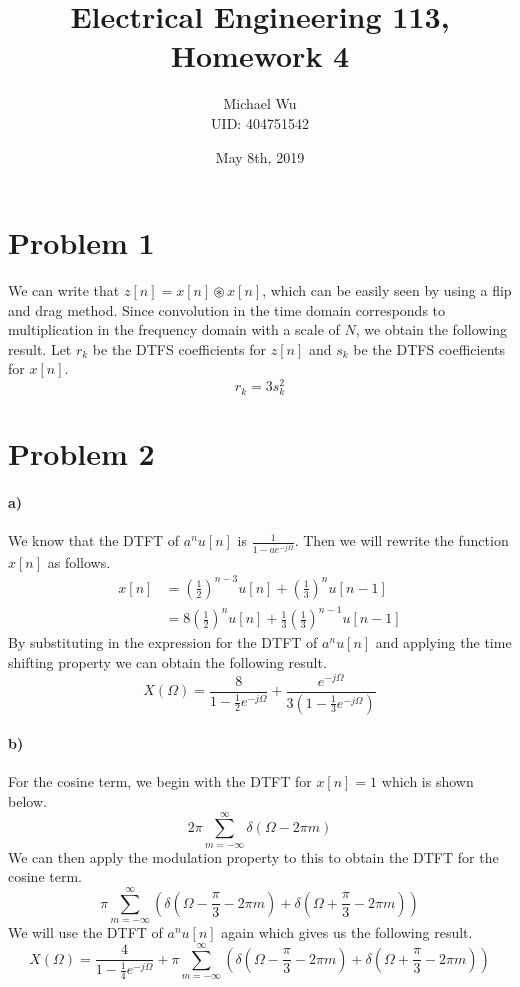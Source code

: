 \documentclass[12pt]{article}
\begin{document}
\title{Electrical Engineering 113, Homework 4}
\date{May 8th, 2019}
\author{Michael Wu\\UID: 404751542}
\maketitle

\section*{Problem 1}

We can write that \(z[n]=x[n]\circledast x[n]\), which can be easily seen by using a flip and drag method. Since
convolution in the time domain corresponds to multiplication in the frequency domain with a scale of \(N\), we obtain
the following result. Let \(r_k\) be the DTFS coefficients for \(z[n]\) and \(s_k\) be the DTFS coefficients for \(x[n]\).
\[r_k = 3s_k^2\]

\section*{Problem 2}

\paragraph{a)}

We know that the DTFT of \(a^nu[n]\) is \(\frac{1}{1-ae^{-j\Omega}}\). Then we will rewrite the function \(x[n]\) as follows.
\begin{align*}
    x[n] &= \left(\frac{1}{2}\right)^{n-3} u[n] + \left(\frac{1}{3}\right)^n u[n-1]\\
    &=8\left(\frac{1}{2}\right)^n u[n] + \frac{1}{3}\left(\frac{1}{3}\right)^{n-1} u[n-1]
\end{align*}
By substituting in the expression for the DTFT of \(a^nu[n]\) and applying the time shifting property we can obtain the following result.
\[X(\Omega)= \frac{8}{1-\frac{1}{2}e^{-j\Omega}} + \frac{e^{-j\Omega}}{3\left(1-\frac{1}{3}e^{-j\Omega}\right)}\]

\paragraph{b)}

For the cosine term, we begin with the DTFT for \(x[n]=1\) which is shown below.
\[2\pi \sum_{m=-\infty}^\infty \delta(\Omega-2\pi m)\]
We can then apply the modulation property to this to obtain the DTFT for the cosine term.
\[\pi\sum_{m=-\infty}^\infty\left(\delta\left(\Omega-\frac{\pi}{3}-2\pi m\right) + \delta\left(\Omega+\frac{\pi}{3}-2\pi m\right)\right)\]
We will use the DTFT of \(a^nu[n]\) again which gives us the following result.
\[X(\Omega) = \frac{4}{1-\frac{1}{4}e^{-j\Omega}}+\pi\sum_{m=-\infty}^\infty\left(\delta\left(\Omega-\frac{\pi}{3}-2\pi m\right)
+\delta\left(\Omega+\frac{\pi}{3}-2\pi m\right)\right)\]
\end{document}
